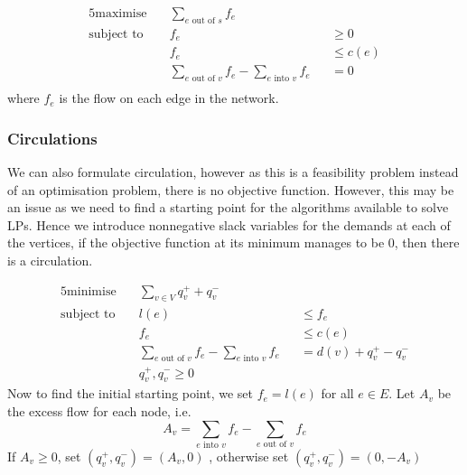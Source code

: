 \documentclass{article}
\theoremstyle{plain}
\theoremstyle{definition}
\begin{document}
            \begin{alignat*}{5}
            \text{maximise} &\quad \sum_{e \text{ out of } s}f_e && \\
            \text{subject to} &\quad f_e &&\geq 0  \tag{for each $e \in E$} \\
            &\quad f_e &&\leq c(e) \tag{for each $e \in E$} \\
            &\quad \sum_{e \text{ out of } v}f_e - \sum_{e \text{ into } v} f_e &&= 0 \\
            \end{alignat*}
            where $f_e$ is the flow on each edge in the network.
        \subsubsection{Circulations}
            We can also formulate circulation, however as this is a feasibility problem instead of an optimisation problem, there is no objective function. However, this may be an issue as we need to find a starting point for the algorithms available to solve LPs. Hence we introduce nonnegative slack variables for the demands at each of the vertices, if the objective function at its minimum manages to be $0$, then there is a circulation.

            \begin{alignat*}{5}
            \text{minimise} &\quad \sum_{v \in V} q_v^+ + q_v^- && \\
            \text{subject to} &\quad l(e) &&\leq f_e  \tag{for each $e \in E$} \\
            &\quad f_e &&\leq c(e)  \tag{for each $e \in E$} \\
            &\quad \sum_{e \text{ out of } v}f_e - \sum_{e \text{ into } v} f_e &&= d(v) + q_v^+ - q_v^- \tag{for each $v \in V$} \\
            &\quad q_v^+, q_v^- \geq 0 \tag{for each $v \in V$}
            \end{alignat*}
            Now to find the initial starting point, we set $f_e = l(e)$ for all $e \in E$. Let $A_v$ be the excess flow for each node, i.e.
            \[ A_v = \sum_{e \text{ into } v} f_e - \sum_{e \text{ out of } v}f_e \]
            If $A_v \geq 0$, set $(q_v^+, q_v^-) = (A_v, 0)$ , otherwise set $(q_v^+, q_v^-) = (0, -A_v)$
\end{document}
